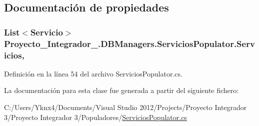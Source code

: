 \subsection{Documentación de propiedades}
\hypertarget{class_proyecto___integrador__3_1_1_d_b_managers_1_1_servicios_populator_a5c0044cf4a9e52ee30c25cfcb8112876}{
\subsubsection[{Servicios}]{\setlength{\rightskip}{0pt plus 5cm}List$<${\bf Servicio}$>$ Proyecto\-\_\-\-Integrador\-\_.\-D\-B\-Managers.\-Servicios\-Populator.\-Servicios\hspace{0.3cm}{\ttfamily [get]}, {\ttfamily [set]}}}\label{class_proyecto___integrador__3_1_1_d_b_managers_1_1_servicios_populator_a5c0044cf4a9e52ee30c25cfcb8112876}


Definición en la línea 54 del archivo Servicios\-Populator.\-cs.



La documentación para esta clase fue generada a partir del siguiente fichero\-:\begin{DoxyCompactItemize}
\item 
C\-:/\-Users/\-Yknx4/\-Documents/\-Visual Studio 2012/\-Projects/\-Proyecto Integrador 3/\-Proyecto Integrador 3/\-Populadores/\hyperlink{_servicios_populator_8cs}{Servicios\-Populator.\-cs}\end{DoxyCompactItemize}

